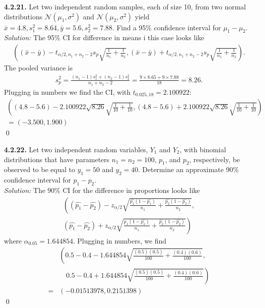 \documentclass{book}
\theoremstyle{definition}
\newcommand{\nn}{\nonumber}
\newcommand{\al}{\alpha}
\newcommand{\N}{\mathcal{N}}
\newcommand{\f}[2]{\frac{#1}{#2}}
\newcommand{\lp}{\left(}
\newcommand{\rp}{\right)}
\begin{document}
 
\newpage
\noindent\textbf{4.2.21.} Let two independent random samples, each of size 10, from two normal
distributions $\N(\mu_1, \sigma^2)$ and $\N(\mu_2, \sigma^2)$ yield $\bar{x} = 4.8, s^2_1 = 8.64, \bar{y} = 5.6, s^2_2 = 7.88$. Find a 95\% confidence interval for $\mu_1 - \mu_2$.\\

\noindent \textit{Solution:} The 95\% CI for difference in means i this case looks like
\begin{align}
\lp (\bar{x} - \bar{y}) - t_{\al/2,n_1+n_2-2}s_p\sqrt{\f{1}{n_1}+\f{1}{n_2}} , (\bar{x} - \bar{y}) + t_{\al/2,n_1+n_2-2}s_p\sqrt{\f{1}{n_1}+\f{1}{n_2}}   \rp.
\end{align}
The pooled variance is
\begin{align}
s_p^2 = \f{(n_1-1)s_1^2 + (n_2-1)s_2^2}{n_1+n_2-2} = \f{9\times 8.65 + 9\times 7.88}{18} = 8.26.
\end{align}
Plugging in numbers we find the CI, with $t_{0.025,18} =2.100922$:
\begin{align}
\lp (4.8-5.6) - 2.100922\sqrt{8.26}\sqrt{\f{1}{10}+\f{1}{10}} , (4.8-5.6) + 2.100922\sqrt{8.26}\sqrt{\f{1}{10}+\f{1}{10}}   \rp\nn\\
 = \boxed{\lp -3.500, 1.900 \rp}
\end{align}\qed











\newpage
\noindent\textbf{4.2.22.} Let two independent random variables, $Y_1$ and $Y_2$, with binomial distributions that have parameters $n_1 = n_2 = 100$, $p_1$, and $p_2$, respectively, be observed
to be equal to $y_1 = 50$ and $y_2 = 40$. Determine an approximate 90\% confidence
interval for $p_1 - p_2$.\\



\noindent \textit{Solution:} The $90\%$ CI for the difference in proportions looks like
\begin{align}
\lp (\hat{p_1} - \hat{p_2}) - z_{\alpha/2}\sqrt{\f{\hat{p_1}(1-\hat{p_1})}{n_1} + \f{\hat{p_2}(1-\hat{p_2})}{n_2}} , \right.\nn\\ \left. (\hat{p_1} - \hat{p_2}) + z_{\alpha/2}\sqrt{\f{\hat{p_1}(1-\hat{p_1})}{n_1} + \f{\hat{p_2}(1-\hat{p_2})}{n_2}} \rp
\end{align}
where $\alpha_{0.05} = 1.644854$. Plugging in numbers, we find
\begin{align}
&\lp 0.5-0.4 - 1.644854\sqrt{ \f{(0.5)(0.5)}{100} + \f{(0.4)(0.6)}{100} },\right.\nn\\ &\quad \left. 0.5-0.4 + 1.644854\sqrt{ \f{(0.5)(0.5)}{100} + \f{(0.4)(0.6)}{100} }  \rp\nn\\
 = &\boxed{ (-0.01513978,0.2151398) }
\end{align}\qed
\end{document}
